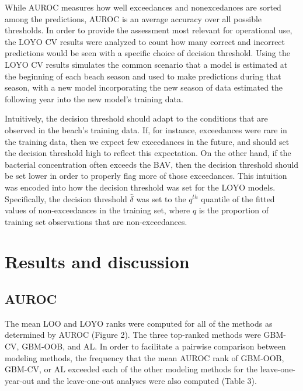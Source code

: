 \documentclass[authoryear,review, 12pt]{elsarticle}
\begin{document}
While AUROC 
measures how well exceedances and nonexcedances are sorted among the
predictions, AUROC is an average accuracy over all possible thresholds.
In order to provide the assessment most relevant for operational use,
the LOYO CV results were analyzed to count how many correct and incorrect
predictions would be seen with a
specific choice of decision threshold. Using the LOYO CV results
simulates the common scenario that a model is estimated at the beginning
of each beach season and used to make predictions during that season,
with a new model incorporating the new season of data estimated the
following year into the new model's training data.

Intuitively, the decision threshold should adapt to the conditions that
are observed in the beach's training data. If, for instance, exceedances
were rare in the training data, then we expect few exceedances in the
future, and should set the decision threshold high to reflect this
expectation. On the other hand, if the bacterial concentration often
exceeds the BAV, then the decision threshold should be set lower in
order to properly flag more of those exceedances. This intuition was
encoded into how the decision threshold was set for the LOYO models.
Specifically, the decision threshold \(\hat{\delta}\) was set to the
\(q^{th}\) quantile of the fitted values of non-exceedances in the
training set, where \(q\) is the proportion of training set observations
that are non-exceedances.

\section{Results and discussion}\label{results}

\subsection{AUROC}\label{auroc}

The mean LOO and LOYO ranks were computed for all of the methods as
determined by AUROC (Figure 2). The three top-ranked methods were
GBM-CV, GBM-OOB, and AL. In order to facilitate a pairwise comparison
between modeling methods, the frequency that the mean AUROC rank of
GBM-OOB, GBM-CV, or AL exceeded each of the other modeling methods for
the leave-one-year-out and the leave-one-out analyses were also computed
(Table 3).
\end{document}
